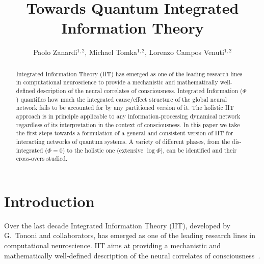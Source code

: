 \documentclass[aps,pra,groupaddress]{revtex4-1}
\begin{document}
\title{Towards Quantum Integrated Information Theory}
\author{Paolo Zanardi$^{1,2}$, Michael Tomka$^{1,2}$, Lorenzo Campos Venuti$^{1,2}$ }





\begin{abstract}
Integrated Information Theory (IIT) has emerged as one of the leading
research lines in computational neuroscience to provide a mechanistic
and ma\-the\-ma\-ti\-cal\-ly well-defined description of the neural correlates
of consciousness. Integrated Information ($\Phi$) quantifies how much the integrated
cause/effect structure of the global neural network fails to be
accounted for by any partitioned version of it.
The holistic IIT approach is in principle applicable to any
information-processing dynamical network regardless of its
interpretation in the context of consciousness.
In this paper we take the first steps towards a formulation of a
general and consistent version of IIT for interacting networks of
quantum systems. 
A variety of different phases, from the dis-integrated ($\Phi=0$) to
the holistic one (extensive $\log\Phi$), can be identified and their
cross-overs studied.
\end{abstract}
\maketitle




\section{Introduction}
Over the last decade Integrated Information Theory (IIT), developed by
G.~Tononi and collaborators, has emerged as one of the leading
research lines in computational neuroscience. 
IIT aims  at providing a mechanistic and mathematically well-defined
description of the neural correlates of consciousness~\cite{IIT-0, IIT-1,IIT-2,IIT-3}. 
\end{document}
